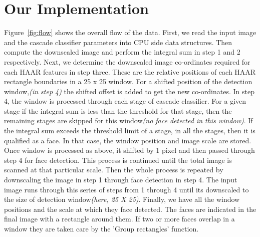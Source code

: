 \section{Our Implementation }\label{sec:impl}



Figure~\ref{fig:flow} shows the overall flow of the data. First, we read
the input image and the cascade classifier parameters into CPU side data structures. 
Then compute the downscaled image and perform the integral sum in step 1 and 2 respectively. 
Next, we determine the downscaled image co-ordinates required for each HAAR features in step three. 
These are the relative positions of each HAAR rectangle boundaries in a 25 x 25 window. 
For a shifted position of the detection window,\textit{(in step 4)} the shifted offset is added to get the new co-ordinates. 
In step 4, the window is processed through each stage of cascade classifier. 
For a given stage if the integral sum is less than the threshold for that stage, 
then the remaining stages are skipped for this window\textit{(no face detected in this window)}. 
If the integral sum exceeds the threshold limit of a stage, in all the stages, then it is qualified as a face. 
In that case, the window position and image scale are stored. Once window is processed as above, 
it shifted by 1 pixel and then passed through step 4 for face detection. 
This process is continued until the total image is scanned at that particular scale. 
Then the whole process is repeated by downscaling the image in step 1 through face detection in step 4. The input image runs through this series of steps from 1 through 4 until its downscaled to the size of detection window\textit{(here, 25 X 25)}. 
Finally, we have all the window positions and the scale at which they face detected. The faces 
are indicated in the final image with a rectangle around them. If two or more faces overlap in a window 
they are taken care by the 'Group rectangles' function. 

